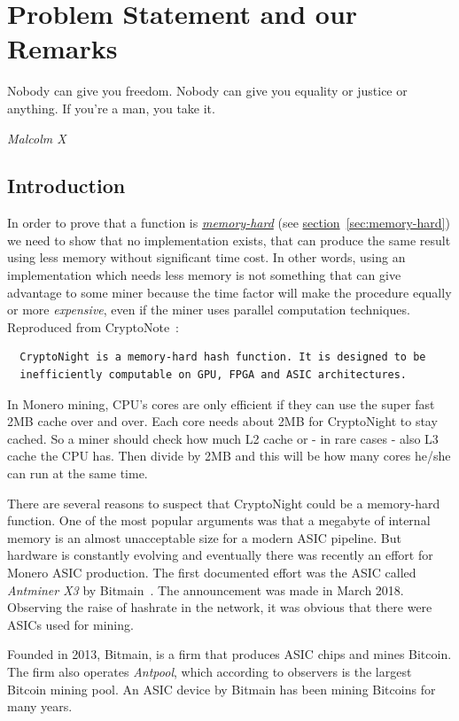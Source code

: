 \chapter{Problem Statement and our Remarks}
%
%
\epigraph{Nobody can give you freedom. Nobody can give you equality or justice or anything. If you're a man, you take it.}{\textit{Malcolm X}}
%
\section{Introduction}
In order to prove that a function is \hyperref[sec:memory-hard]{\emph{memory-hard}} (see \hyperref[sec:memory-hard]{section}~\ref{sec:memory-hard}) we need to show that no implementation exists, that can produce the same result using less memory without significant time cost. In other words, using an implementation which needs less memory is not something that can give advantage to some miner because the time factor will make the procedure equally or more \emph{expensive}, even if the miner uses parallel computation techniques. Reproduced from CryptoNote~\cite{cryptonight}:
\begin{verbatim}
  CryptoNight is a memory-hard hash function. It is designed to be
  inefficiently computable on GPU, FPGA and ASIC architectures.
\end{verbatim}

In Monero mining, CPU's cores are only efficient if they can use the super fast 2MB cache over and over. Each core needs about 2MB for CryptoNight to stay cached. So a miner should check how much L2 cache or - in rare cases - also L3 cache the CPU has. Then divide by 2MB and this will be how many cores he/she can run at the same time.

There are several reasons to suspect that CryptoNight could be a memory-hard function. One of the most popular arguments was that a megabyte of internal memory is an almost unacceptable size for a modern ASIC pipeline. But hardware is constantly evolving and eventually there was recently an effort for Monero ASIC production. The first documented effort was the ASIC called \emph{Antminer X3} by Bitmain~\cite{bitmain}. The announcement was made in March 2018. Observing the raise of hashrate in the network, it was obvious that there were ASICs used for mining.

Founded in 2013, Bitmain, is a firm that produces ASIC chips and mines Bitcoin. The firm also operates \emph{Antpool}, which according to observers is the largest Bitcoin mining pool. An ASIC device by Bitmain has been mining Bitcoins for many years.

